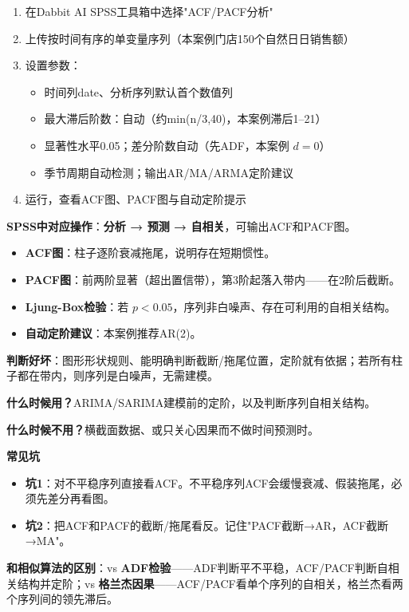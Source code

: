 \begin{algosposs}
\begin{enumerate}
    \item 在Dabbit AI SPSS工具箱中选择"ACF/PACF分析"
    \item 上传按时间有序的单变量序列（本案例门店150个自然日日销售额）
    \item 设置参数：
    \begin{itemize}
        \item 时间列date、分析序列默认首个数值列
        \item 最大滞后阶数：自动（约min(n/3,40)，本案例滞后1--21）
        \item 显著性水平0.05；差分阶数自动（先ADF，本案例 $d=0$）
        \item 季节周期自动检测；输出AR/MA/ARMA定阶建议
    \end{itemize}
    \item 运行，查看ACF图、PACF图与自动定阶提示
\end{enumerate}

\textbf{SPSS中对应操作}：\textbf{分析 → 预测 → 自相关}，可输出ACF和PACF图。
\end{algosposs}

\begin{algoresult}
\begin{itemize}
    \item \textbf{ACF图}：柱子逐阶衰减拖尾，说明存在短期惯性。
    \item \textbf{PACF图}：前两阶显著（超出置信带），第3阶起落入带内——在2阶后截断。
    \item \textbf{Ljung-Box检验}：若 $p<0.05$，序列非白噪声、存在可利用的自相关结构。
    \item \textbf{自动定阶建议}：本案例推荐AR(2)。
\end{itemize}

\textbf{判断好坏}：图形形状规则、能明确判断截断/拖尾位置，定阶就有依据；若所有柱子都在带内，则序列是白噪声，无需建模。
\end{algoresult}

\begin{algonotes}
\textbf{什么时候用？}ARIMA/SARIMA建模前的定阶，以及判断序列自相关结构。

\textbf{什么时候不用？}横截面数据、或只关心因果而不做时间预测时。

\textbf{常见坑}
\begin{itemize}
    \item \textbf{坑1}：对不平稳序列直接看ACF。不平稳序列ACF会缓慢衰减、假装拖尾，必须先差分再看图。
    \item \textbf{坑2}：把ACF和PACF的截断/拖尾看反。记住"PACF截断→AR，ACF截断→MA"。
\end{itemize}

\textbf{和相似算法的区别}：vs \textbf{ADF检验}——ADF判断平不平稳，ACF/PACF判断自相关结构并定阶；vs \textbf{格兰杰因果}——ACF/PACF看单个序列的自相关，格兰杰看两个序列间的领先滞后。
\end{algonotes}


